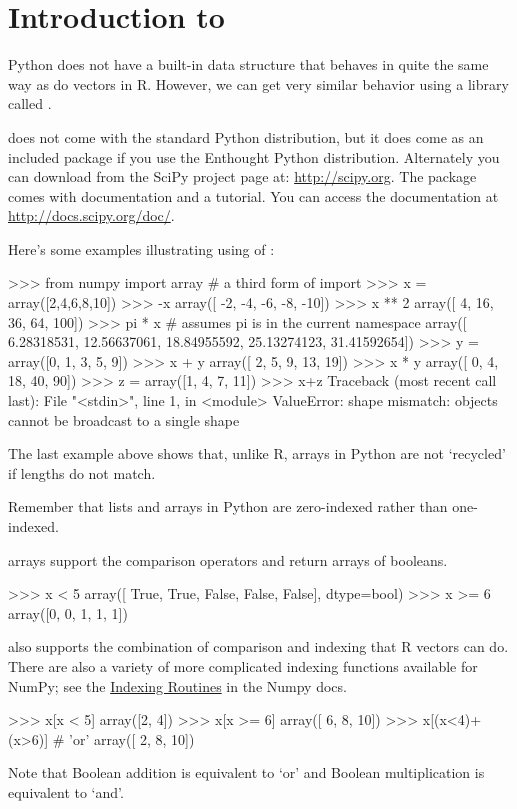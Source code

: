 
\section{Introduction to \numpy}

Python does not have a built-in data
structure that behaves in quite the same way as do vectors in R.
However, we can get very similar behavior using a library called \numpy.

\numpy does not come with the standard Python distribution, but it does come
as an included package if you use the Enthought Python distribution.
Alternately you can download \numpy from the SciPy project page at:
\url{http://scipy.org}. The \numpy package comes with documentation and
a tutorial. You can access the documentation at
\url{http://docs.scipy.org/doc/}.

Here's some examples illustrating using of \numpy:
\begin{python}
>>> from numpy import array # a third form of import 
>>> x = array([2,4,6,8,10])
>>> -x
array([ -2,  -4,  -6,  -8, -10])
>>> x ** 2
array([  4,  16,  36,  64, 100])
>>> pi * x # assumes pi is in the current namespace
array([  6.28318531,  12.56637061,  18.84955592,  25.13274123,  31.41592654])
>>> y = array([0, 1, 3, 5, 9])
>>> x + y
array([ 2,  5,  9, 13, 19])
>>> x * y
array([ 0,  4, 18, 40, 90])
>>> z = array([1, 4, 7, 11])
>>> x+z
Traceback (most recent call last):
  File "<stdin>", line 1, in <module>
ValueError: shape mismatch: objects cannot be broadcast to a single shape
\end{python}
%
The last example above shows that, unlike R, \numpy arrays in Python are
not `recycled' if lengths do not match.

Remember that lists and arrays in Python are zero-indexed rather than
one-indexed.
%

\numpy arrays support the comparison operators and return arrays of
booleans.
\begin{python}
    >>> x < 5 
    array([ True, True, False, False, False], dtype=bool)
    >>> x >= 6 
    array([0, 0, 1, 1, 1])
\end{python}
%
\numpy also supports the combination of comparison and indexing that R vectors
can do. There are also a variety of more complicated indexing functions
available for NumPy; see the
\href{http://docs.scipy.org/doc/numpy/reference/routines.indexing.html}{Indexing Routines} in the Numpy docs.
%
\begin{python}
>>> x[x < 5]
array([2, 4])
>>> x[x >= 6]
array([ 6,  8, 10])
>>> x[(x<4)+(x>6)]  # 'or'
array([ 2,  8, 10])
\end{python}
%
Note that Boolean addition is equivalent to `or' and Boolean
multiplication is equivalent to `and'.

